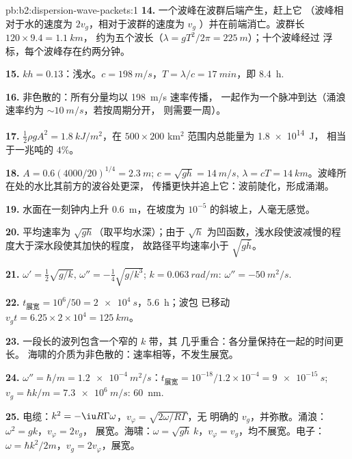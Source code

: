 \begin{solution}{pb:b2:dispersion-wave-packets:1}
\textbf{14.} 一个波峰在波群后端产生，赶上它
（波峰相对于水的速度为 $2v_g$，相对于波群的速度为 $v_g$
）并在前端消亡。波群长 $120 \times 9.4 = \qty{1.1}{km}$，
约为五个波长（$\lambda = gT^2/2\pi = \qty{225}{m}$）；十个波峰经过
浮标，每个波峰存在约两分钟。

\textbf{15.} $kh = 0.13$：浅水。$c = \qty{198}{m/s}$，$T = \lambda/c = \qty{17}{min}$，即
\qty{8.4}{h}.

\textbf{16.} 非色散的：所有分量均以 \qty{198}{m/s} 速率传播，
一起作为一个脉冲到达（涌浪速率约为 $\sim\qty{10}{m/s}$，若按周期分开，
则需要一周）。

\textbf{17.} $\tfrac12\rho gA^2 = \qty{1.8}{kJ/m^2}$，在 $500 \times 200$ km$^2$ 范围内总能量为 \qty{1.8e14}{J}，
相当于一兆吨的 $4\%$。

\textbf{18.} $A = 0.6(4000/20)^{1/4} = \qty{2.3}{m}$; $c = \sqrt{gh} = \qty{14}{m/s}$, $\lambda =
cT = \qty{14}{km}$。波峰所在处的水比其前方的波谷处更深，
传播更快并追上它：波前陡化，形成涌潮。

\textbf{19.} 水面在一刻钟内上升 \qty{0.6}{m}，在坡度为
$10^{-5}$ 的斜坡上，人毫无感觉。

\textbf{20.} 平均速率为 $\sqrt{gh}$（取平均水深）；由于
$\sqrt h$ 为凹函数，浅水段使波减慢的程度大于深水段使其加快的程度，
故路径平均速率小于 $\sqrt{g\bar h}$。

\textbf{21.} $\omega' = \tfrac12\sqrt{g/k}$, $\omega'' = -\tfrac14\sqrt{g/k^3}$; $k = \qty{0.063}{rad/m}$:
$\omega'' = \qty{-50}{m^2/s}$.

\textbf{22.} $t_{\text{展宽}} = 10^6/50 = \qty{2e4}{s}$，\qty{5.6}{h}；波包
已移动 $v_gt = 6.25 \times 2 \times 10^4 = \qty{125}{km}$。

\textbf{23.} 一段长的波列包含一个窄的 $k$ 带，其
几乎重合：各分量保持在一起的时间更长。
海啸的介质为非色散的：速率相等，不发生展宽。

\textbf{24.} $\omega'' = \hbar/m = \qty{1.2e-4}{m^2/s}$：$t_{\text{展宽}} = 10^{-18}/1.2 \times
10^{-4} = \qty{9e-15}{s}$; $v_g = \hbar k/m = \qty{7.3e6}{m/s}$: \qty{60}{nm}.

\textbf{25.} 电缆：$k^2 = -\iu R\Gamma\omega$，$v_\varphi = \sqrt{2\omega/R\Gamma}$，无
明确的 $v_g$，并弥散。涌浪：$\omega^2 = gk$，$v_\varphi = 2v_g$，
展宽。海啸：$\omega = \sqrt{gh}\,k$，$v_\varphi = v_g$，均不展宽。电子：
$\omega = \hbar k^2/2m$，$v_g = 2v_\varphi$，展宽。
\end{solution}
